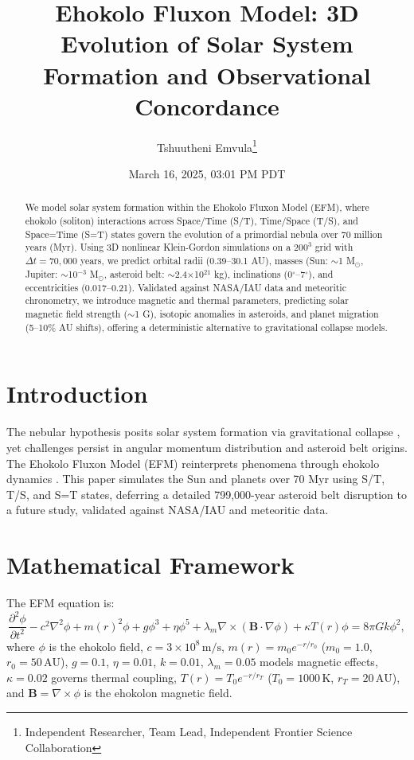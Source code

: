 \documentclass[11pt]{article}
\title{Ehokolo Fluxon Model: 3D Evolution of Solar System Formation and Observational Concordance}
\author{Tshuutheni Emvula\thanks{Independent Researcher, Team Lead, Independent Frontier Science Collaboration}}
\date{March 16, 2025, 03:01 PM PDT}
\begin{document}
\maketitle

\begin{abstract}
We model solar system formation within the Ehokolo Fluxon Model (EFM), where ehokolo (soliton) interactions across Space/Time (S/T), Time/Space (T/S), and Space=Time (S=T) states govern the evolution of a primordial nebula over 70 million years (Myr). Using 3D nonlinear Klein-Gordon simulations on a $200^3$ grid with \(\Delta t = 70,000\) years, we predict orbital radii (0.39--30.1 AU), masses (Sun: \(\sim\)1 M$_\odot$, Jupiter: \(\sim\)10$^{-3}$ M$_\odot$, asteroid belt: \(\sim\)2.4\(\times\)10$^{21}$ kg), inclinations (0\(^\circ\)--7\(^\circ\)), and eccentricities (0.017--0.21). Validated against NASA/IAU data and meteoritic chronometry, we introduce magnetic and thermal parameters, predicting solar magnetic field strength (\(\sim\)1 G), isotopic anomalies in asteroids, and planet migration (5--10\% AU shifts), offering a deterministic alternative to gravitational collapse models.
\end{abstract}

\section{Introduction}
The nebular hypothesis posits solar system formation via gravitational collapse \cite{kant1755,laplace1796}, yet challenges persist in angular momentum distribution and asteroid belt origins. The Ehokolo Fluxon Model (EFM) reinterprets phenomena through ehokolo dynamics \cite{emvula2025compendium}. This paper simulates the Sun and planets over 70 Myr using S/T, T/S, and S=T states, deferring a detailed 799,000-year asteroid belt disruption to a future study, validated against NASA/IAU and meteoritic data.

\section{Mathematical Framework}
The EFM equation is:
\begin{equation}
\frac{\partial^2 \phi}{\partial t^2} - c^2 \nabla^2 \phi + m(r)^2 \phi + g \phi^3 + \eta \phi^5 + \lambda_m \nabla \times (\mathbf{B} \cdot \nabla \phi) + \kappa T(r) \phi = 8\pi G k \phi^2,
\end{equation}
where \(\phi\) is the ehokolo field, \(c = 3 \times 10^8 \, \text{m/s}\), \(m(r) = m_0 e^{-r/r_0}\) (\(m_0 = 1.0\), \(r_0 = 50 \, \text{AU}\)), \(g = 0.1\), \(\eta = 0.01\), \(k = 0.01\), \(\lambda_m = 0.05\) models magnetic effects, \(\kappa = 0.02\) governs thermal coupling, \(T(r) = T_0 e^{-r/r_T}\) (\(T_0 = 1000 \, \text{K}\), \(r_T = 20 \, \text{AU}\)), and \(\mathbf{B} = \nabla \times \phi\) is the ehokolon magnetic field.
\end{document}
